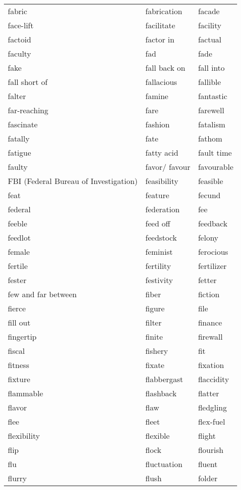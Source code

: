 \documentclass{minimal}
\begin{document}
\begin{longtable}{p{2.7cm}@{\hskip 0.2cm}p{2.7cm}@{\hskip 0.2cm}p{2.7cm}}
fabric & fabrication & facade \\
face-lift & facilitate & facility \\
factoid & factor in & factual \\
faculty & fad & fade \\
fake & fall back on & fall into \\
fall short of & fallacious & fallible \\
falter & famine & fantastic \\
far-reaching & fare & farewell \\
fascinate & fashion & fatalism \\
fatally & fate & fathom \\
fatigue & fatty acid & fault time \\
faulty & favor/ favour & favourable \\
FBI (Federal Bureau of Investigation) & feasibility & feasible \\
feat & feature & fecund \\
federal & federation & fee \\
feeble & feed off & feedback \\
feedlot & feedstock & felony \\
female & feminist & ferocious \\
fertile & fertility & fertilizer \\
fester & festivity & fetter \\
few and far between & fiber & fiction \\
fierce & figure & file \\
fill out & filter & finance \\
fingertip & finite & firewall \\
fiscal & fishery & fit \\
fitness & fixate & fixation \\
fixture & flabbergast & flaccidity \\
flammable & flashback & flatter \\
flavor & flaw & fledgling \\
flee & fleet & flex-fuel \\
flexibility & flexible & flight \\
flip & flock & flourish \\
flu & fluctuation & fluent \\
flurry & flush & folder \\

\end{longtable}
\end{document}
